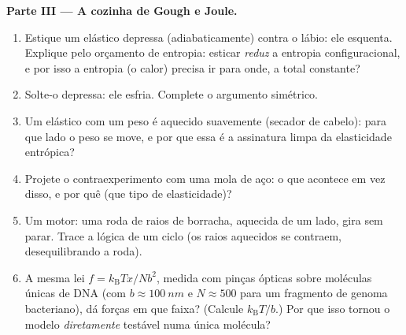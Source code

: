 \begin{problem}
\medskip\noindent\textbf{Parte III --- A cozinha de Gough e Joule.}
\begin{enumerate}[resume]
  \item Estique um elástico depressa (adiabaticamente) contra o
        lábio: ele esquenta. Explique pelo orçamento de entropia:
        esticar \emph{reduz} a entropia configuracional, e por isso a
        entropia (o calor) precisa ir para onde, a total constante?
  \item Solte-o depressa: ele esfria. Complete o argumento simétrico.
  \item Um elástico com um peso é aquecido suavemente (secador de
        cabelo): para que lado o peso se move, e por que essa é a
        assinatura limpa da elasticidade entrópica?
  \item Projete o contraexperimento com uma mola de aço: o que
        acontece em vez disso, e por quê (que tipo de elasticidade)?
  \item Um motor: uma roda de raios de borracha, aquecida de um lado,
        gira sem parar. Trace a lógica de um ciclo (os raios aquecidos
        se contraem, desequilibrando a roda).
  \item A mesma lei $f = k_{\text{B}}Tx/Nb^2$, medida com pinças
        ópticas sobre moléculas únicas de DNA (com $b \approx
        \qty{100}{nm}$ e $N \approx 500$ para um fragmento de genoma
        bacteriano), dá forças em que faixa? (Calcule
        $k_{\text{B}}T/b$.) Por que isso tornou o modelo
        \emph{diretamente} testável numa única molécula?
\end{enumerate}


\end{problem}
